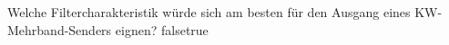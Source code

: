     {Welche Filtercharakteristik würde sich am besten für den Ausgang eines KW-Mehrband-Senders eignen?}
    {}
    {}
    {}
    {}
    {false}{true}